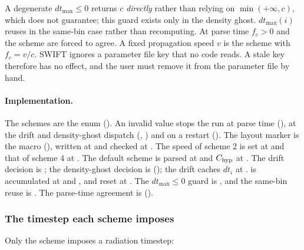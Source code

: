 A degenerate $dt_{\max} \le 0$ returns $c$ \emph{directly} rather than relying on
$\min(+\infty, c)$, which  does not guarantee; this guard
exists only in the density ghost.
$dt_{\max}(i)$ reuses  in the same-bin case rather than
recomputing. At parse time $f_c > 0$ and the  scheme are
forced to agree. A fixed propagation speed $v$ is
the  scheme with $f_c = v/c$. SWIFT
ignores a parameter file key that no code reads. A stale key therefore has no
effect, and the user must remove it from the parameter file by hand.

\paragraph{Implementation.} The schemes are the enum 
(). An invalid value stops the run at parse
time (), at the drift and density-ghost
dispatch (, ) and on a restart
(). The layout marker is the macro
 (),
written at  and checked at . The speed of
scheme 2 is set at  and that of scheme 4 at
. The default scheme is parsed at
 and $C_{\rm hyp}$ at
. The drift decision is
; the density-ghost decision is
 ();
the drift caches $dt_i$ at .
 is accumulated at
 and , and reset at
. The $dt_{\max} \le 0$ guard is
, and the same-bin reuse is
. The parse-time agreement is
().

\subsubsection{The timestep each scheme imposes}
\label{sec:isrf-eqdisc-timestep}

Only the  scheme imposes a radiation timestep:

